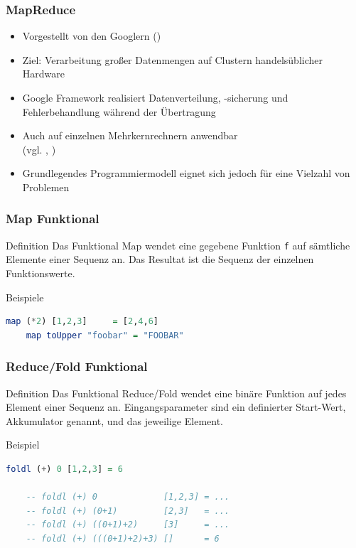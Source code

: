 \documentclass[presentation, shownotes]{beamer}
\begin{document}
\begin{frame}
\frametitle{MapReduce}
    \begin{itemize}
        \item Vorgestellt von den Googlern \citeauthor{DBLP:conf/osdi/DeanG04} (\citeyear{DBLP:conf/osdi/DeanG04})
        \item Ziel: Verarbeitung großer Datenmengen auf Clustern handelsüblicher Hardware
        \item Google Framework realisiert Datenverteilung, -sicherung und Fehlerbehandlung während der Übertragung
        \item Auch auf einzelnen Mehrkernrechnern anwendbar\\
        (vgl. \cite{ranger2007evaluating}, \cite{talbot2011phoenix})
        \item Grundlegendes Programmiermodell eignet sich jedoch für eine Vielzahl von Problemen
    \end{itemize}
\end{frame}

\begin{frame}[fragile]
\frametitle{Map Funktional}
    \begin{block}{Definition}
        Das Funktional Map wendet eine gegebene Funktion \texttt{f} auf sämtliche Elemente einer Sequenz an. Das Resultat ist die Sequenz der einzelnen Funktionswerte.
    \end{block}

    \begin{block}{Beispiele}
    \begin{lstlisting}[language=haskell]
    map (*2) [1,2,3]     = [2,4,6]
    map toUpper "foobar" = "FOOBAR"
    \end{lstlisting}
    \end{block}
\end{frame}

\begin{frame}[fragile]
\frametitle{Reduce/Fold Funktional}
    \begin{block}{Definition}
        Das Funktional Reduce/Fold wendet eine binäre Funktion auf jedes Element einer Sequenz an.
        Eingangsparameter sind ein definierter Start-Wert, Akkumulator genannt, und das jeweilige Element.
    \end{block}

    \begin{block}{Beispiel}
    \begin{lstlisting}[language=haskell]
    foldl (+) 0 [1,2,3] = 6

    -- foldl (+) 0             [1,2,3] = ...
    -- foldl (+) (0+1)         [2,3]   = ...
    -- foldl (+) ((0+1)+2)     [3]     = ...
    -- foldl (+) (((0+1)+2)+3) []      = 6
    \end{lstlisting}
    \end{block}
\end{frame}
\end{document}
